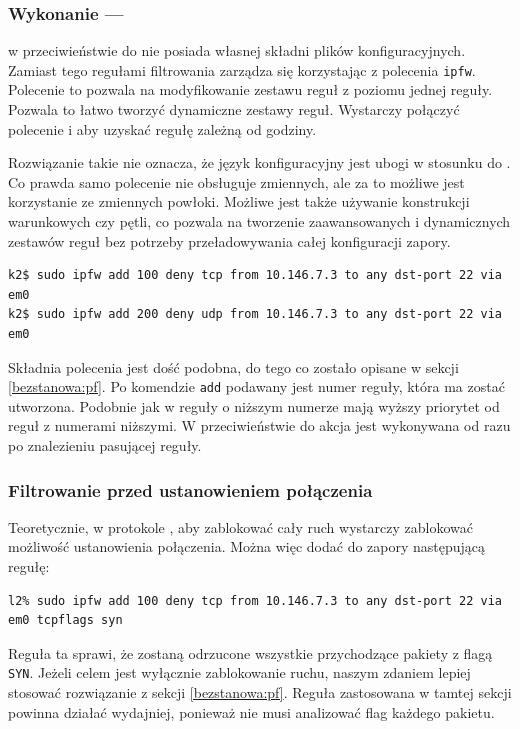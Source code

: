 \subsubsection{Wykonanie --- \ipfw{}}
\label{bezstanowa:ipfw}

\ipfw{} w przeciwieństwie do \pf{} nie posiada własnej składni plików
konfiguracyjnych. Zamiast tego regułami filtrowania zarządza się korzystając z
polecenia \texttt{ipfw}. Polecenie to pozwala na modyfikowanie zestawu reguł z
poziomu jednej reguły. Pozwala to łatwo tworzyć dynamiczne zestawy reguł.
Wystarczy połączyć polecenie \ipfw{} i \cron{} aby uzyskać regułę zależną od
godziny.

Rozwiązanie takie nie oznacza, że język konfiguracyjny jest ubogi w stosunku do
\pf{}. Co prawda samo polecenie \ipfw{} nie obsługuje zmiennych, ale za to
możliwe jest korzystanie ze zmiennych powłoki. Możliwe jest także używanie
konstrukcji warunkowych czy pętli, co pozwala na tworzenie zaawansowanych i
dynamicznych zestawów reguł bez potrzeby przeładowywania całej konfiguracji
zapory.

\begin{lstlisting}
k2$ sudo ipfw add 100 deny tcp from 10.146.7.3 to any dst-port 22 via em0
k2$ sudo ipfw add 200 deny udp from 10.146.7.3 to any dst-port 22 via em0
\end{lstlisting}

Składnia polecenia jest dość podobna, do tego co zostało opisane w sekcji
\ref{bezstanowa:pf}. Po komendzie \texttt{add} podawany jest numer reguły, która
ma zostać utworzona. Podobnie jak w \pf{} reguły o niższym numerze mają wyższy
priorytet od reguł z numerami niższymi. W przeciwieństwie do \pf{} akcja jest
wykonywana od razu po znalezieniu pasującej reguły.


\subsubsection{Filtrowanie przed ustanowieniem połączenia}

Teoretycznie, w protokole \tcp{}, aby zablokować cały ruch wystarczy zablokować
możliwość ustanowienia połączenia. Można więc dodać do zapory następującą
regułę:

\begin{lstlisting}
l2% sudo ipfw add 100 deny tcp from 10.146.7.3 to any dst-port 22 via em0 tcpflags syn
\end{lstlisting}

Reguła ta sprawi, że zostaną odrzucone wszystkie przychodzące pakiety z flagą
\texttt{SYN}. Jeżeli celem jest wyłącznie zablokowanie ruchu, naszym zdaniem
lepiej stosować rozwiązanie z sekcji \ref{bezstanowa:pf}. Reguła zastosowana w
tamtej sekcji powinna działać wydajniej, ponieważ nie musi analizować flag
\tcp{} każdego pakietu.

